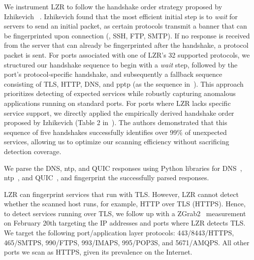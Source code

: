 We instrument LZR to follow the handshake order strategy proposed by Izhikevich \etal~\cite{lzr}.
Izhikevich \etal found that the most efficient initial step is to \textit{wait} for servers to send an initial packet, as certain protocols transmit a banner that can be fingerprinted upon connection (\eg, SSH, FTP, SMTP).
If no response is received from the server that can already be fingerprinted after the handshake, a protocol packet is sent.
For ports associated with one of LZR's 32 supported protocols, we structured our handshake sequence to begin with a \textit{wait} step, followed by the port's protocol-specific handshake, and subsequently a fallback sequence consisting of TLS, HTTP, DNS, and \gls{pptp} (as the sequence in~\cite{lzr}). %
This approach prioritizes detecting of expected services while robustly capturing anomalous applications running on standard ports.
For ports where LZR lacks specific service support, we directly applied the empirically derived handshake order proposed by Izhikevich \etal (Table 2 in~\cite{lzr}).
The authors demonstrated that this sequence of five handshakes successfully identifies over 99\% of unexpected services, allowing us to optimize our scanning efficiency without sacrificing detection coverage.

We parse the DNS, \gls{ntp}, and QUIC responses using Python libraries for DNS~\cite{python-dns}, \gls{ntp}~\cite{python-ntp}, and QUIC~\cite{zirngibl2024quichunting}, and fingerprint the successfully parsed responses. %

LZR can fingerprint services that run with TLS.
However, LZR cannot detect whether the scanned host runs, for example, HTTP over TLS (HTTPS). %
Hence, to detect services running over TLS, we follow up with a ZGrab2~\cite{censys15} measurement on February 20th targeting the IP addresses and ports where LZR detects TLS.
We target the following port/application layer protocols: 443/8443/HTTPS, 465/SMTPS, 990/FTPS, 993/IMAPS, 995/POP3S, and 5671/AMQPS.
All other ports we scan as HTTPS, given its prevalence on the Internet.

